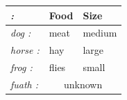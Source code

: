\documentclass{article}
\begin{document}
	\begin{tabular}{>{\itshape}l<{:} ll}
		\toprule
		\multicolumn{1}{l}{Animal} & Food  & Size   \\
		\midrule
		dog    & meat  & medium \\
		horse  & hay   & large  \\
		frog   & flies & small  \\
		fuath & \multicolumn{2}{c}{unknown} \\
		\bottomrule
	\end{tabular}
\end{document}
